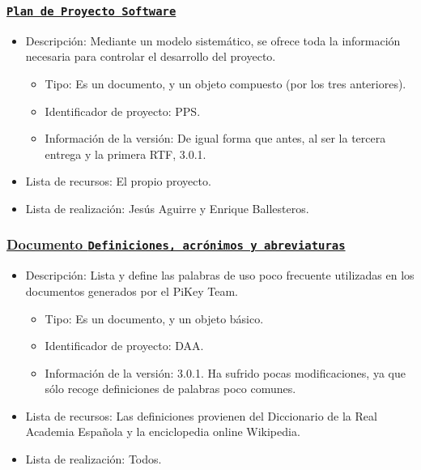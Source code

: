 \documentclass[spanish,a4paper,11pt, twoside]{report}	%
\begin{document}
			\subsubsection{\underline{\texttt{Plan de Proyecto Software}}}
			\begin{itemize}	
				\item{Descripción:} Mediante un modelo sistemático, se ofrece toda la información necesaria para controlar el desarrollo del proyecto.
					\begin{itemize}	
						\item{Tipo:} Es un documento, y un objeto compuesto (por los tres anteriores). 
						\item{Identificador de proyecto:} PPS.
						\item{Información de la versión:} De igual forma que antes, al ser la tercera entrega y la primera RTF, 3.0.1.
					\end{itemize}	
				\item{Lista de recursos:} El propio proyecto.
				\item{Lista de realización:} Jesús Aguirre y Enrique Ballesteros.
			\end{itemize}	

			\subsubsection{\underline{Documento \texttt{Definiciones, acrónimos y abreviaturas}}}
			\begin{itemize}	
				\item{Descripción:} Lista y define las palabras de uso poco frecuente utilizadas en los documentos generados por el PiKey Team.
					\begin{itemize}	
						\item{Tipo:} Es un documento, y un objeto básico. 
						\item{Identificador de proyecto:} DAA.
						\item{Información de la versión:} 3.0.1. Ha sufrido pocas modificaciones, ya que sólo recoge definiciones de palabras poco comunes.
					\end{itemize}	
				\item{Lista de recursos:} Las definiciones provienen del Diccionario de la Real Academia Española y la enciclopedia online Wikipedia.
				\item{Lista de realización:} Todos.
			\end{itemize}		
\end{document}
